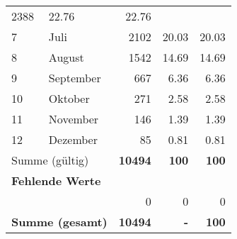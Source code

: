 \begin{longtable}{lXrrr}
       \num{2388} &
       \num[round-mode=places,round-precision=2]{22.76} &
         \num[round-mode=places,round-precision=2]{22.76} \\

     7 &
     \multicolumn{1}{X}{ Juli   } &


       \num{2102} &
       \num[round-mode=places,round-precision=2]{20.03} &
         \num[round-mode=places,round-precision=2]{20.03} \\

     8 &
     \multicolumn{1}{X}{ August   } &


       \num{1542} &
       \num[round-mode=places,round-precision=2]{14.69} &
         \num[round-mode=places,round-precision=2]{14.69} \\

     9 &
     \multicolumn{1}{X}{ September   } &


       \num{667} &
       \num[round-mode=places,round-precision=2]{6.36} &
         \num[round-mode=places,round-precision=2]{6.36} \\

     10 &
     \multicolumn{1}{X}{ Oktober   } &


       \num{271} &
       \num[round-mode=places,round-precision=2]{2.58} &
         \num[round-mode=places,round-precision=2]{2.58} \\

     11 &
     \multicolumn{1}{X}{ November   } &


       \num{146} &
       \num[round-mode=places,round-precision=2]{1.39} &
         \num[round-mode=places,round-precision=2]{1.39} \\

     12 &
     \multicolumn{1}{X}{ Dezember   } &


       \num{85} &
       \num[round-mode=places,round-precision=2]{0.81} &
         \num[round-mode=places,round-precision=2]{0.81} \\
     \midrule
     \multicolumn{2}{l}{Summe (gültig)} &
       \textbf{\num{10494}} &
     \textbf{\num{100}} &
       \textbf{\num[round-mode=places,round-precision=2]{100}} \\
     \multicolumn{5}{l}{\textbf{Fehlende Werte}}\\
      & & 0 & 0 & 0 \\
     \midrule
     \multicolumn{2}{l}{\textbf{Summe (gesamt)}} &
          \textbf{\num{10494}} &
        \textbf{-} &
        \textbf{\num{100}} \\
     \bottomrule
     \end{longtable}
     
